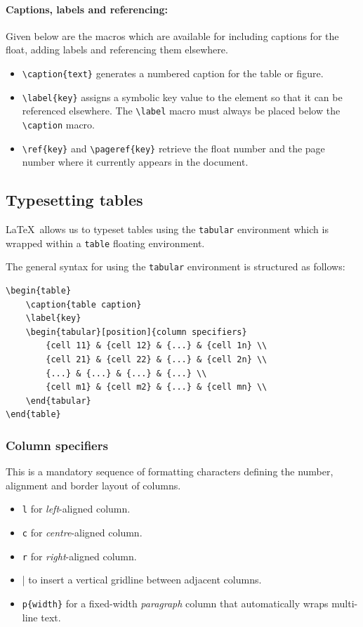	\paragraph{Captions, labels and referencing:} Given below are the macros which are available for including captions for the float, adding labels and referencing them elsewhere.
	\begin{itemize}
		\item \lstinline|\caption{text}| generates a numbered caption for the table or figure.
		\item \lstinline|\label{key}| assigns a symbolic key value to the element so that it can be referenced elsewhere. The \lstinline|\label| macro must always be placed below the \lstinline|\caption| macro.
		\item \lstinline|\ref{key}| and \lstinline|\pageref{key}| retrieve the float number and the page number where it currently appears in the document.
	\end{itemize}
	
	\subsection{Typesetting tables}
		\LaTeX\ allows us to typeset tables using the \lstinline|tabular| environment which is wrapped within a \lstinline|table| floating environment.
		
		The general syntax for using the \lstinline|tabular| environment is structured as follows:
\begin{lstlisting}
\begin{table}
	\caption{table caption}
	\label{key}
	\begin{tabular}[position]{column specifiers}
		{cell 11} & {cell 12} & {...} & {cell 1n} \\
		{cell 21} & {cell 22} & {...} & {cell 2n} \\
		{...} & {...} & {...} & {...} \\
		{cell m1} & {cell m2} & {...} & {cell mn} \\
	\end{tabular}
\end{table}
\end{lstlisting}
		
		\subsubsection{Column specifiers}
			This is a mandatory sequence of formatting characters defining the number, alignment and border layout of columns.
			\begin{itemize}
				\item \verb|l| for \emph{left}-aligned column.
				\item \verb|c| for \emph{centre}-aligned column.
				\item \verb|r| for \emph{right}-aligned column.
				\item | to insert a vertical gridline between adjacent columns.
				\item \verb|p{width}| for a fixed-width \emph{paragraph} column that automatically wraps multi-line text.
			\end{itemize}
		

